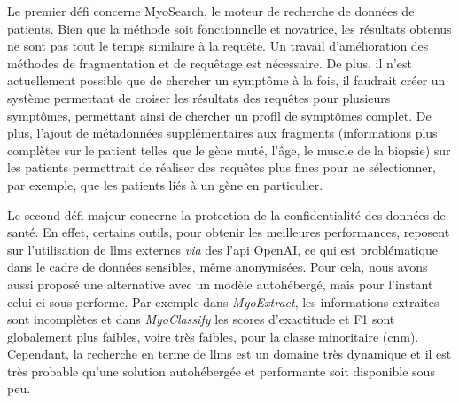 Le premier défi concerne MyoSearch, le moteur de recherche de données de patients. Bien que la méthode soit fonctionnelle et novatrice, les résultats obtenus ne sont pas tout le temps similaire à la requête. Un travail d'amélioration des méthodes de fragmentation et de requêtage est nécessaire. De plus, il n'est actuellement possible que de chercher un symptôme à la fois, il faudrait créer un système permettant de croiser les résultats des requêtes pour plusieurs symptômes, permettant ainsi de chercher un profil de symptômes complet. De plus, l'ajout de métadonnées supplémentaires aux fragments (informations plus complètes sur le patient telles que le gène muté, l'âge, le muscle de la biopsie) sur les patients permettrait de réaliser des requêtes plus fines pour ne sélectionner, par exemple, que les patients liés à un gène en particulier.

Le second défi majeur concerne la protection de la confidentialité des données de santé. En effet, certains outils, pour obtenir les meilleures performances, reposent sur l'utilisation de \gls{llms} externes \textit{via} des l'\gls{api} OpenAI, ce qui est problématique dans le cadre de données sensibles, même anonymisées. Pour cela, nous avons aussi proposé une alternative avec un modèle autohébergé, mais pour l'instant celui-ci sous-performe. Par exemple dans \textit{MyoExtract}, les informations extraites sont incomplètes et dans \textit{MyoClassify} les scores d'exactitude et F1 sont globalement plus faibles, voire très faibles, pour la classe minoritaire (\gls{cnm}). Cependant, la recherche en terme de \gls{llms} est un domaine très dynamique et il est très probable qu'une solution autohébergée et performante soit disponible sous peu.